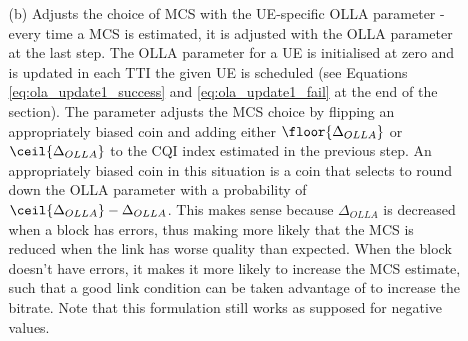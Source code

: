 
\begin{comment}
\begin{itemize}
    \item[1] de
    \item[(a)]  df
    \item[4.] 
\end{itemize}
\end{comment}

\begin{itemize}
    \item[] \begin{itemize} %
        \item[(b)] Adjusts the choice of \ac{MCS} with the UE-specific \ac{OLLA} parameter - every time a MCS is estimated, it is adjusted with the OLLA parameter at the last step. The OLLA parameter for a UE is initialised at zero and is updated in each TTI the given UE is scheduled (see Equations \eqref{eq:ola_update1_success} and \eqref{eq:ola_update1_fail} at the end of the section). The parameter adjusts the MCS choice by flipping an appropriately biased coin and adding either $\floor{\Delta_{OLLA}}$ or $\ceil{\Delta_{OLLA}}$ to the CQI index estimated in the previous step. An appropriately biased coin in this situation is a coin that selects to round down the OLLA parameter with a probability of $\ceil{\Delta_{OLLA}} - \Delta_{OLLA}$. This makes sense because $\Delta_{OLLA}$ is decreased when a block has errors, thus making more likely that the MCS is reduced when the link has worse quality than expected. When the block doesn't have errors, it makes it more likely to increase the MCS estimate, such that a good link condition can be taken advantage of to increase the bitrate. Note that this formulation still works as supposed for negative values.


\end{itemize}
\end{itemize}
